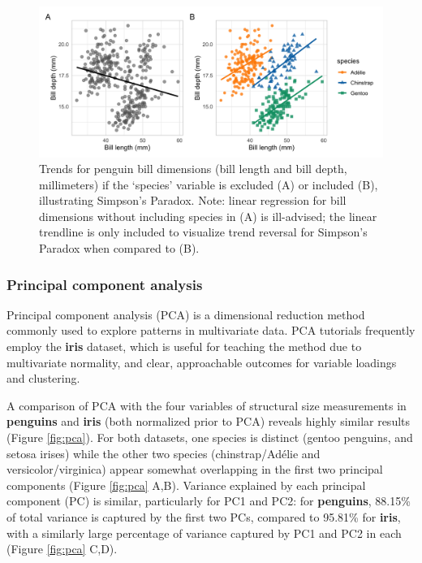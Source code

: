 \begin{Schunk}
\begin{figure}[htbp]

{\centering \includegraphics[width=6in]{fig/simpson_gg} 

}

\caption[Trends for penguin bill dimensions (bill length and bill depth, millimeters) if the ‘species’ variable is excluded (A) or included (B), illustrating Simpson’s Paradox]{Trends for penguin bill dimensions (bill length and bill depth, millimeters) if the ‘species’ variable is excluded (A) or included (B), illustrating Simpson’s Paradox. Note: linear regression for bill dimensions without including species in (A) is ill-advised; the linear trendline is only included to visualize trend reversal for Simpson’s Paradox when compared to (B).}\label{fig:simpsons}
\end{figure}
\end{Schunk}

\hypertarget{principal-component-analysis}{%
\subsubsection{Principal component
analysis}\label{principal-component-analysis}}

Principal component analysis (PCA) is a dimensional reduction method
commonly used to explore patterns in multivariate data. PCA tutorials
frequently employ the \textbf{iris} dataset, which is useful for
teaching the method due to multivariate normality, and clear,
approachable outcomes for variable loadings and clustering.

A comparison of PCA with the four variables of structural size
measurements in \textbf{penguins} and \textbf{iris} (both normalized
prior to PCA) reveals highly similar results (Figure \ref{fig:pca}). For
both datasets, one species is distinct (gentoo penguins, and setosa
irises) while the other two species (chinstrap/Adélie and
versicolor/virginica) appear somewhat overlapping in the first two
principal components (Figure \ref{fig:pca} A,B). Variance explained by
each principal component (PC) is similar, particularly for PC1 and PC2:
for \textbf{penguins}, 88.15\% of total variance is captured by the
first two PCs, compared to 95.81\% for \textbf{iris}, with a similarly
large percentage of variance captured by PC1 and PC2 in each (Figure
\ref{fig:pca} C,D).

